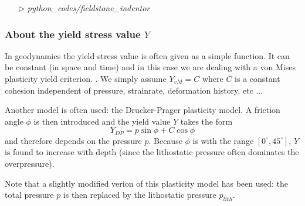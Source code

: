 \begin{mdframed}[backgroundcolor=green!5]
\begin{itemize}
\item[$\triangleright$] {\sl python\_codes/fieldstone\_indentor}
\end{itemize}
\end{mdframed}




\subsubsection{About the yield stress value $Y$}

In geodynamics the yield stress value is often given as a simple function. 
It can be constant (in space and time) and in this case we are dealing with a von Mises plasticity yield criterion. 
. We simply assume $Y_{vM}=C$ where $C$ is a constant cohesion independent of pressure, strainrate,
deformation history, etc ... 

Another model is often used: the Drucker-Prager plasticity model. 
A friction angle $\phi$ is then introduced and the yield value $Y$ takes the form
\[
Y_{DP}=p \sin\phi + C \cos \phi
\]
and therefore depends on the pressure $p$. Because $\phi$ is with the range $[0^\circ,45^\circ]$, $Y$ is
found to increase with depth (since the lithostatic pressure often dominates the overpressure).

Note that a slightly modified verion of this plasticity model has been used: the total pressure $p$
is then replaced by the lithostatic pressure $p_{lith}$.









